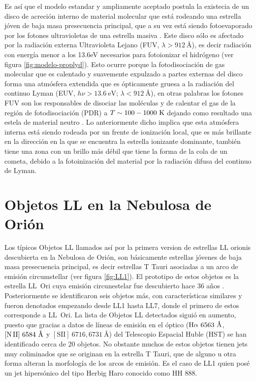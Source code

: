 Es así que el modelo estandar y ampliamente aceptado postula la existecia de un  disco de acreción interno de material molecular que está rodeando una estrella jóven de baja masa presecuencia principal, que a su vez está siendo fotoevaporado por los fotones ultravioletas de una estrella masiva \citep{Johnstone:1998, Henney:1998a}. Este disco sólo es afectado por la radiación externa Ultravioleta Lejano (FUV, \(\lambda > 912~\text{\AA{}} \)), es decir radiación con energía menor a los 13.6eV necesarios para fotoionizar el hidrógeno (ver figura \ref{fig:modelo-proplyd}). Esto ocurre porque la fotodisociación de gas molecular que es calentado y suavemente expulzado a partes externas del disco forma una atmósfera extendida que es ópticamente gruesa a la radiación del continuo Lyman (EUV, \(h\nu > 13.6~\text{eV}\); \(\lambda < 912~\text{\AA{}} \)), en otras palabras los fotones FUV son los responsables de disociar las moléculas y de calentar el gas de la región de fotodisociación (PDR) a \(T\sim100-1000~\mathrm{K}\) dejando como resultado una estela de material neutro \citep{Johnstone:1998}. Lo anteriormente dicho implica que esta atmósfera interna está siendo rodeada por un frente de ionización local, que es más brillante en la dirección en la que se encuentra la estrella ionizante dominante, también tiene una zona con un brillo más débil que tiene la forma de la cola de un cometa, debido a la fotoinización del material por la radiación difusa del continuo de Lyman.\\ 

\section{Objetos LL en la  Nebulosa de Orión}
\label{sec:objeto-ll}

Los típicos Objetos LL llamados así por la primera version de estrellas LL orionis descubierta en la Nebulosa de Orión, son  básicamente estrellas jóvenes de baja masa presecuencia principal, es decir estrellas T Tauri asociadas a un arco de emisión circumstellar (ver figura \ref{fig:LL1}). El prototipo de estos objetos es la estrella LL~Ori cuya emisión circunestelar fue descubierto hace 36 años \citep{Gull:1979a}. Posteriormente se identificaron seis objetos más, con características similares \citep{Bally:2001a} y fueron denotados empezando desde LL1 hasta LL7, donde el primero de estos corresponde a LL~Ori. La lista de Objetos LL detectados siguió en aumento, puesto que gracias a datos de líneas de emisión en el óptico (\(\mathrm{H}\alpha~6563~\text{\AA{}}\), \(\mathrm{[N\,II]}~6584~\text{\AA{}}\) y \([\text{SII}]~6716,6731~\text{\AA{}}\)) del Telescopio Espacial Huble (HST) \citep{Bally:2000a, Bally:2006a} se han identificado cerca de 20 objetos. No obstante muchos de estos objetos tienen jets muy coliminados que se originan en la estrella T Tauri, que de alguno u otra forma alteran la morfología de los arcos de emisión. Es el caso de LL1 quien posé un jet hipersónico del tipo Herbig Haro conocido como HH 888.\\

